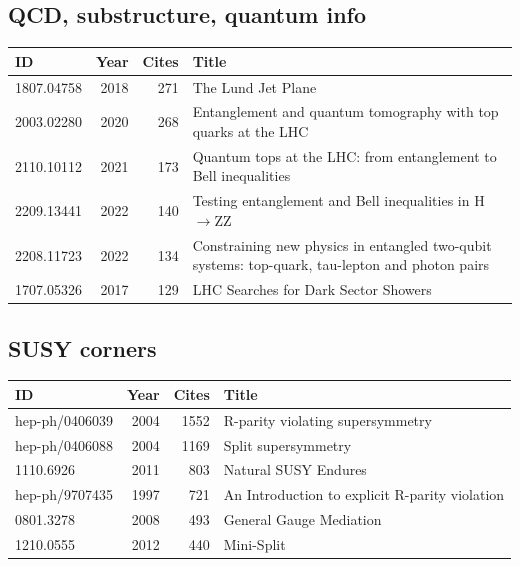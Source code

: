\documentclass[11pt,a4paper]{article}
\begin{document}
\subsection*{QCD, substructure, quantum info}
\begin{center}\footnotesize\begin{tabular}{@{}p{2.5cm}rr p{9cm}@{}}\toprule ID & Year & Cites & Title\\\midrule
1807.04758 & 2018 & 271 & The Lund Jet Plane\\
2003.02280 & 2020 & 268 & Entanglement and quantum tomography with top quarks at the LHC\\
2110.10112 & 2021 & 173 & Quantum tops at the LHC: from entanglement to Bell inequalities\\
2209.13441 & 2022 & 140 & Testing entanglement and Bell inequalities in H$\to$ZZ\\
2208.11723 & 2022 & 134 & Constraining new physics in entangled two-qubit systems: top-quark, tau-lepton and photon pairs\\
1707.05326 & 2017 & 129 & LHC Searches for Dark Sector Showers\\
\bottomrule\end{tabular}\end{center}
\subsection*{SUSY corners}
\begin{center}\footnotesize\begin{tabular}{@{}p{2.5cm}rr p{9cm}@{}}\toprule ID & Year & Cites & Title\\\midrule
hep-ph/0406039 & 2004 & 1552 & R-parity violating supersymmetry\\
hep-ph/0406088 & 2004 & 1169 & Split supersymmetry\\
1110.6926 & 2011 & 803 & Natural SUSY Endures\\
hep-ph/9707435 & 1997 & 721 & An Introduction to explicit R-parity violation\\
0801.3278 & 2008 & 493 & General Gauge Mediation\\
1210.0555 & 2012 & 440 & Mini-Split\\
\bottomrule\end{tabular}\end{center}
\end{document}
